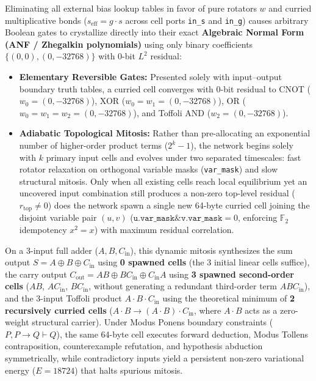 \documentclass[11pt, a4paper]{article}
\begin{document}
Eliminating all external bias lookup tables in favor of pure rotators $w$ and curried multiplicative bonds ($s_{\mathrm{eff}} = g \cdot s$ across cell ports \texttt{in\_s} and \texttt{in\_g}) causes arbitrary Boolean gates to crystallize directly into their exact \textbf{Algebraic Normal Form (ANF / Zhegalkin polynomials)} using only binary coefficients $\{(0,0), (0,-32768)\}$ with 0-bit $L^2$ residual:
\begin{itemize}
    \item \textbf{Elementary Reversible Gates:} Presented solely with input--output boundary truth tables, a curried cell converges with 0-bit residual to CNOT ($w_0 = (0,-32768)$), XOR ($w_0 = w_1 = (0,-32768)$), OR ($w_0 = w_1 = w_2 = (0,-32768)$), and Toffoli AND ($w_2 = (0,-32768)$).
    \item \textbf{Adiabatic Topological Mitosis:} Rather than pre-allocating an exponential number of higher-order product terms ($2^k - 1$), the network begins solely with $k$ primary input cells and evolves under two separated timescales: fast rotator relaxation on orthogonal variable masks (\texttt{var\_mask}) and slow structural mitosis. Only when all existing cells reach local equilibrium yet an uncovered input combination still produces a non-zero top-level residual ($r_{\mathrm{top}} \neq 0$) does the network spawn a single new 64-byte curried cell joining the disjoint variable pair $(u, v)$ ($\texttt{u.var\_mask} \mathbin{\&} \texttt{v.var\_mask} = 0$, enforcing $\mathbb{F}_2$ idempotency $x^2 = x$) with maximum residual correlation.
\end{itemize}

On a 3-input full adder ($A, B, C_{\mathrm{in}}$), this dynamic mitosis synthesizes the sum output $S = A \oplus B \oplus C_{\mathrm{in}}$ using \textbf{0 spawned cells} (the 3 initial linear cells suffice), the carry output $C_{\mathrm{out}} = AB \oplus BC_{\mathrm{in}} \oplus C_{\mathrm{in}}A$ using \textbf{3 spawned second-order cells} ($AB$, $AC_{\mathrm{in}}$, $BC_{\mathrm{in}}$, without generating a redundant third-order term $ABC_{\mathrm{in}}$), and the 3-input Toffoli product $A \cdot B \cdot C_{\mathrm{in}}$ using the theoretical minimum of \textbf{2 recursively curried cells} ($A \cdot B \to (A \cdot B) \cdot C_{\mathrm{in}}$, where $A \cdot B$ acts as a zero-weight structural carrier). Under Modus Ponens boundary constraints ($P, P \to Q \vdash Q$), the same 64-byte cell executes forward deduction, Modus Tollens contraposition, counterexample refutation, and hypothesis abduction symmetrically, while contradictory inputs yield a persistent non-zero variational energy ($E = 18724$) that halts spurious mitosis.
\end{document}
